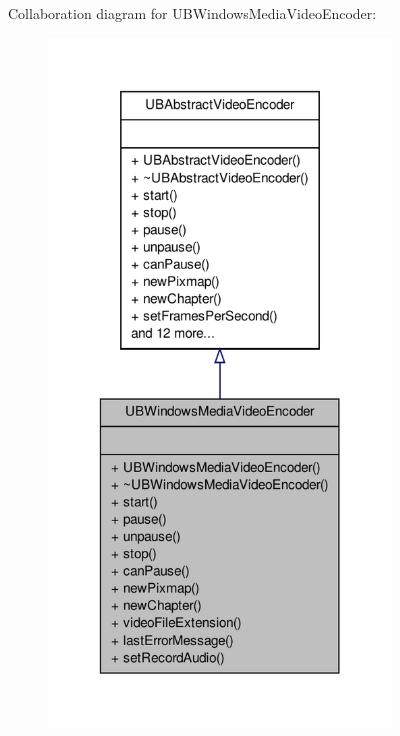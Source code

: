 Collaboration diagram for U\-B\-Windows\-Media\-Video\-Encoder\-:
\nopagebreak
\begin{figure}[H]
\begin{center}
\leavevmode
\includegraphics[width=258pt]{d2/d63/class_u_b_windows_media_video_encoder__coll__graph}
\end{center}
\end{figure}

